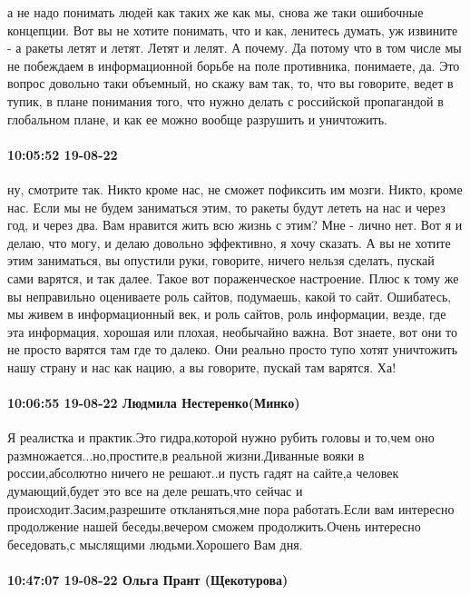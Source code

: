 а не надо понимать людей как таких же как мы, снова же таки ошибочные
концепции. Вот вы не хотите понимать, что и как, ленитесь думать, уж извините -
а ракеты летят и летят. Летят и лелят. А почему. Да потому что в том числе мы
не побеждаем в информационной борьбе на поле противника, понимаете, да. Это
вопрос довольно таки объемный, но скажу вам так, то, что вы говорите, ведет в
тупик, в плане понимания того, что нужно делать с российской пропагандой в
глобальном плане, и как ее можно вообще разрушить и уничтожить.

\paragraph{10:05:52 19-08-22}

ну, смотрите так. Никто кроме нас, не сможет пофиксить им мозги. Никто, кроме
нас. Если мы не будем заниматься этим, то ракеты будут лететь на нас и через
год, и через два. Вам нравится жить всю жизнь с этим? Мне - лично нет. Вот я и
делаю, что могу, и делаю довольно эффективно, я хочу сказать. А вы не хотите
этим заниматься, вы опустили руки, говорите, ничего нельзя сделать, пускай сами
варятся, и так далее. Такое вот пораженческое настроение. Плюс к тому же вы
неправильно оцениваете роль сайтов, подумаешь, какой то сайт. Ошибатесь, мы
живем в информационный век, и роль сайтов, роль информации, везде, где эта
информация, хорошая или плохая, необычайно важна. Вот знаете, вот они то не
просто варятся там где то далеко. Они реально просто тупо хотят уничтожить нашу
страну и нас как нацию, а вы говорите, пускай там варятся. Ха!

\paragraph{10:06:55 19-08-22 Людмила Нестеренко(Минко)}

Я реалистка и практик.Это гидра,которой нужно рубить головы и то,чем оно
размножается...но,простите,в реальной жизни.Диванные вояки в россии,абсолютно
ничего не решают..и пусть гадят на сайте,а человек думающий,будет это все на
деле решать,что сейчас и происходит.Засим,разрешите откланяться,мне пора
работать.Если вам интересно продолжение нашей беседы,вечером сможем
продолжить.Очень интересно беседовать,с мыслящими людьми.Хорошего Вам дня.

\paragraph{10:47:07 19-08-22 Ольга Прант (Щекотурова)}


